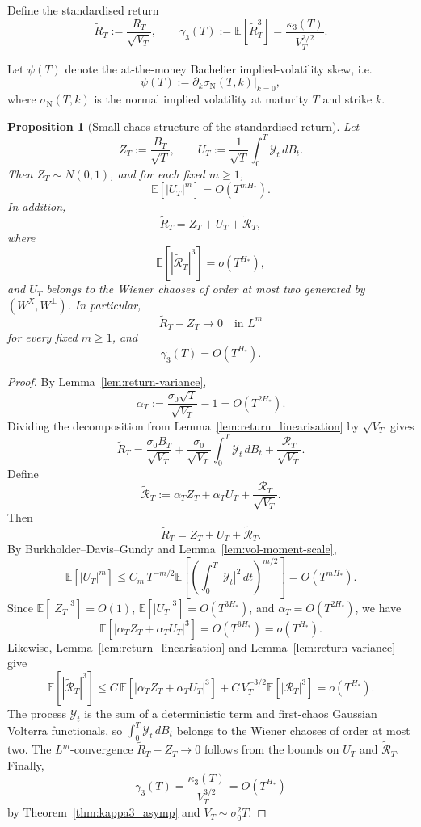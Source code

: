 \documentclass[11pt,a4paper]{amsart}
\theoremstyle{plain}
\newtheorem{proposition}[theorem]{Proposition}
\theoremstyle{definition}
\theoremstyle{remark}
\newcommand{\EE}{\mathbb{E}}
\begin{document}
Define the standardised return
\[
\widetilde R_T:=\frac{R_T}{\sqrt{V_T}},
\qquad
\gamma_3(T):=\EE[\widetilde R_T^3]
=
\frac{\kappa_3(T)}{V_T^{3/2}}.
\]

Let $\psi(T)$ denote the at-the-money Bachelier implied-volatility skew, i.e.
\[
\psi(T):=\partial_k \sigma_{\mathrm N}(T,k)\big|_{k=0},
\]
where $\sigma_{\mathrm N}(T,k)$ is the normal implied volatility at maturity $T$ and strike $k$.

\begin{proposition}[Small-chaos structure of the standardised return]\label{prop:std-return-structure}
Let
\[
Z_T:=\frac{B_T}{\sqrt T},
\qquad
U_T:=\frac{1}{\sqrt T}\int_0^T \mathcal Y_t\,dB_t.
\]
Then \(Z_T\sim N(0,1)\), and for each fixed \(m\ge1\),
\[
\EE[|U_T|^m]=O(T^{mH_*}).
\]
In addition,
\[
\widetilde R_T
=
Z_T+U_T+\widetilde{\mathcal R}_T,
\]
where
\[
\EE[|\widetilde{\mathcal R}_T|^3]=o(T^{H_*}),
\]
and \(U_T\) belongs to the Wiener chaoses of order at most two generated by
\((W^X,W^\perp)\). In particular,
\[
\widetilde R_T-Z_T\to0
\quad\text{in }L^m
\]
for every fixed \(m\ge1\), and
\[
\gamma_3(T)=O(T^{H_*}).
\]
\end{proposition}

\begin{proof}
By Lemma~\ref{lem:return-variance},
\[
\alpha_T
:=
\frac{\sigma_0\sqrt T}{\sqrt{V_T}}-1
=
O(T^{2H_*}).
\]
Dividing the decomposition from Lemma~\ref{lem:return_linearisation} by \(\sqrt{V_T}\) gives
\[
\widetilde R_T
=
\frac{\sigma_0 B_T}{\sqrt{V_T}}
+
\frac{\sigma_0}{\sqrt{V_T}}\int_0^T \mathcal Y_t\,dB_t
+
\frac{\mathcal R_T}{\sqrt{V_T}}.
\]
Define
\[
\widetilde{\mathcal R}_T
:=
\alpha_T Z_T+\alpha_T U_T+\frac{\mathcal R_T}{\sqrt{V_T}}.
\]
Then
\[
\widetilde R_T=Z_T+U_T+\widetilde{\mathcal R}_T.
\]
By Burkholder--Davis--Gundy and Lemma~\ref{lem:vol-moment-scale},
\[
\EE[|U_T|^m]
\le
C_m\,T^{-m/2}\EE\!\left[\left(\int_0^T |\mathcal Y_t|^2\,dt\right)^{m/2}\right]
=
O(T^{mH_*}).
\]
Since \(\EE[|Z_T|^3]=O(1)\), \(\EE[|U_T|^3]=O(T^{3H_*})\), and \(\alpha_T=O(T^{2H_*})\), we have
\[
\EE[|\alpha_T Z_T+\alpha_T U_T|^3]
=
O(T^{6H_*})
=
o(T^{H_*}).
\]
Likewise, Lemma~\ref{lem:return_linearisation} and Lemma~\ref{lem:return-variance} give
\[
\EE[|\widetilde{\mathcal R}_T|^3]
\le
C\,\EE[|\alpha_T Z_T+\alpha_T U_T|^3]
+
C\,V_T^{-3/2}\EE[|\mathcal R_T|^3]
=
o(T^{H_*}).
\]
The process \(\mathcal Y_t\) is the sum of a deterministic term and first-chaos Gaussian
Volterra functionals, so \(\int_0^T \mathcal Y_t\,dB_t\) belongs to the Wiener chaoses of order
at most two. The \(L^m\)-convergence \(\widetilde R_T-Z_T\to0\) follows from the bounds on
\(U_T\) and \(\widetilde{\mathcal R}_T\). Finally,
\[
\gamma_3(T)=\frac{\kappa_3(T)}{V_T^{3/2}}
=
O(T^{H_*})
\]
by Theorem~\ref{thm:kappa3_asymp} and \(V_T\sim \sigma_0^2T\).
\end{proof}
\end{document}
